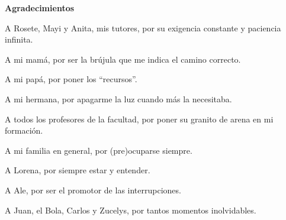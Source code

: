 {\Large \textbf{Agradecimientos} \vspace{.3cm}}

A Rosete, Mayi y Anita, mis tutores, por su exigencia constante y paciencia infinita.

A mi mamá, por ser la brújula que me indica el camino correcto.

A mi papá, por poner los ``recursos''.

A mi hermana, por apagarme la luz cuando más la necesitaba.

A todos los profesores de la facultad, por poner su granito de arena en mi formación.

A mi familia en general, por (pre)ocuparse siempre.

A Lorena, por siempre estar y entender.

A Ale, por ser el promotor de las interrupciones.

A Juan, el Bola, Carlos y Zucelys, por tantos momentos inolvidables.


